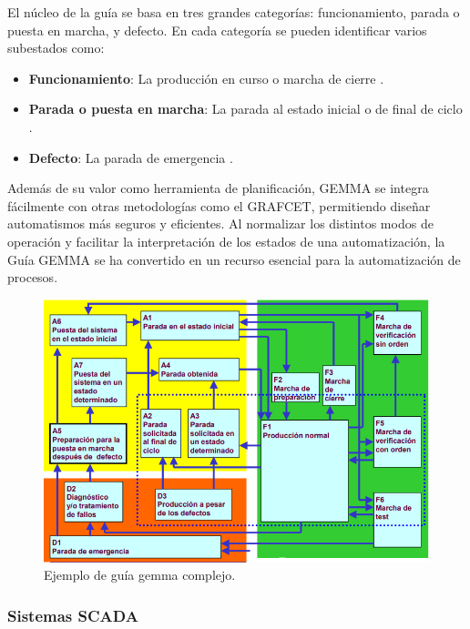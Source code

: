 El núcleo de la guía se basa en tres grandes categorías: funcionamiento, parada o puesta en marcha, y defecto. En cada categoría se pueden identificar varios subestados como:

\begin{itemize}
  \item  \textbf{Funcionamiento}: La producción en curso o marcha de cierre \cite{guia_gemma}.
  \item \textbf{Parada o puesta en marcha}: La parada al estado inicial o de final de ciclo \cite{guia_gemma}.
  \item \textbf{Defecto}: La parada de emergencia \cite{guia_gemma}. 
\end{itemize} 

Además de su valor como herramienta de planificación, GEMMA se integra fácilmente con otras metodologías como el GRAFCET, permitiendo diseñar automatismos más seguros y eficientes. Al normalizar los distintos modos de operación y facilitar la interpretación de los estados de una automatización, la Guía GEMMA se ha convertido en un recurso esencial para la automatización de procesos.

\begin{figure} [h!]
  \begin{center}
    \includegraphics[width=15cm]{figs/guia_gemma}
  \end{center}
  \caption{\centering Ejemplo de guía gemma complejo. \cite{guia_gemma}}
  \label{fig:guia_gemma}
\end{figure} 

\subsubsection{Sistemas SCADA}


